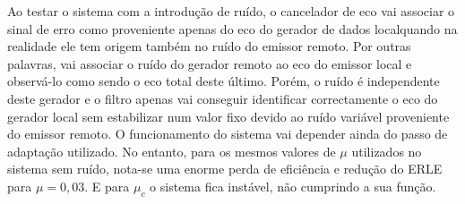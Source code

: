 \documentclass[a4paper,11pt]{report}
\begin{document}
Ao testar o sistema com a introdução de ruído, o cancelador de eco vai associar o sinal de erro como proveniente apenas do eco do gerador de dados localquando na realidade ele tem origem também no ruído do emissor remoto. Por outras palavras, vai associar o ruído do gerador remoto ao eco do emissor local e observá-lo como sendo o eco total deste último. Porém, o ruído é independente deste gerador e o filtro apenas vai conseguir identificar correctamente o eco do gerador local sem estabilizar num valor fixo devido ao ruído variável proveniente do emissor remoto. O funcionamento do sistema vai depender ainda do passo de adaptação utilizado. No entanto, para os mesmos valores de $\mu$ utilizados no sistema sem ruído, nota-se uma enorme perda de eficiência e redução do ERLE para $\mu=0,03$. E para $\mu_c$ o sistema fica instável, não cumprindo a sua função.
\end{document}
